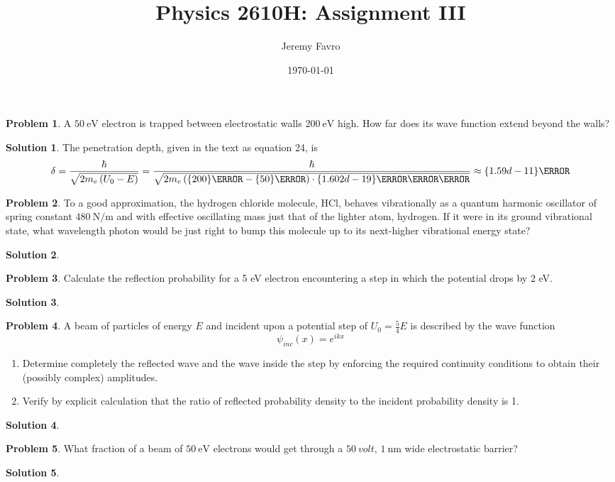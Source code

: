 \documentclass[10pt]{article}
\title{Physics 2610H: Assignment III}
\author{Jeremy Favro}
\date{\today}
\theoremstyle{definition}
\newtheorem{problem}{Problem}
\newtheorem{soln}{Solution}
\begin{document}
\maketitle

\begin{problem}
A $\qty{50}{\electronvolt}$ electron is trapped between electrostatic walls $\qty{200}{\electronvolt}$ high.
How far does its wave function extend beyond the walls?
\end{problem}
\begin{soln}
The penetration depth, given in the text as equation 24, is 
$$\delta=\frac{\hbar}{\sqrt{2m_e\left(U_0-E\right)}}=\frac{\hbar}{\sqrt{2m_e\left(\qty{200}{\electronvolt}-\qty{50}{\electronvolt}\right)\cdot\qty{1.602d-19}{\joule\per\electronvolt}}}\approx\qty{1.59d-11}{\meter}$$
\end{soln}

\begin{problem}
To a good approximation, the hydrogen chloride molecule, HCl, behaves vibrationally as a quantum harmonic
oscillator of spring constant $\qty{480}{\newton\per\meter}$ and with effective oscillating mass just that of the lighter atom, hydrogen.
If it were in its ground vibrational state, what wavelength photon would be just right to bump this molecule up to its next-higher vibrational energy state?
\end{problem}
\begin{soln}

\end{soln}

\begin{problem}
  Calculate the reflection probability for a 5 eV
  electron encountering a step in which the potential
  drops by 2 eV.
\end{problem}
\begin{soln}

\end{soln}

\begin{problem}
A beam of particles of energy $E$ and incident upon a potential step of $U_0 = \frac{5}{4}E$ is described by the wave function
$$\psi_{inc}(x)=e^{ikx}$$
\begin{enumerate}[label=(\alph*)]
  \item Determine completely the reflected wave and the
        wave inside the step by enforcing the required
        continuity conditions to obtain their (possibly
        complex) amplitudes.
  \item Verify by explicit calculation that the ratio of
        reflected probability density to the incident probability density is 1.
\end{enumerate}
\end{problem}
\begin{soln}

\end{soln}

\begin{problem}
What fraction of a beam of $\qty{50}{\electronvolt}$ electrons would get through a $\qty{50}{volt}$, $\qty{1}{\nano\meter}$ wide electrostatic barrier?
\end{problem}
\begin{soln}

\end{soln}
\end{document}
